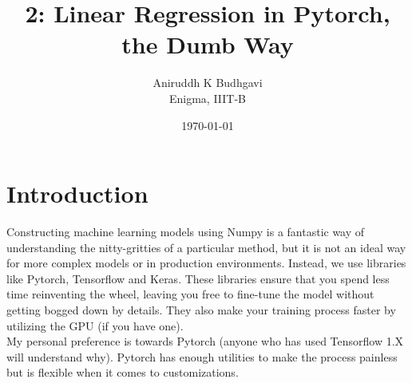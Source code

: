 \documentclass{article}
\title{2: Linear Regression in Pytorch, the Dumb Way}
\date{\today}
\author{Aniruddh K Budhgavi \\Enigma, IIIT-B}
\begin{document}
    \maketitle 
    \section{Introduction}
    Constructing machine learning models using Numpy is a fantastic way 
    of understanding the nitty-gritties of a particular method, but it is 
    not an ideal way for more complex models or in production environments.
    Instead, we use libraries like Pytorch, Tensorflow and Keras. These libraries
    ensure that you spend less time reinventing the wheel, leaving you free to fine-tune
    the model without getting bogged down by details. They also make your training process
    faster by utilizing the GPU (if you have one).
    \\
    My personal preference is towards Pytorch (anyone who has used Tensorflow 
    1.X will understand why). Pytorch has enough utilities to make the process painless
    but is flexible when it comes to customizations.
\end{document}
